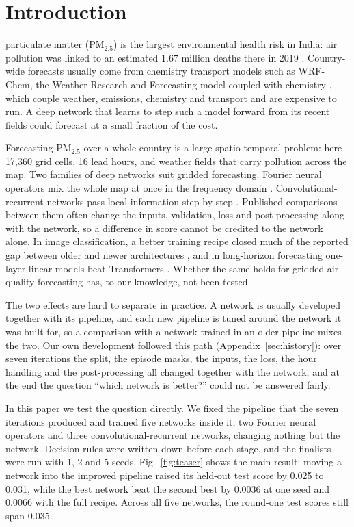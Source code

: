 \documentclass[journal]{IEEEtran}
\newcommand{\PM}{PM$_{2.5}$}
\begin{document}
\section{Introduction}
\label{sec:intro}
 particulate matter (\PM) is the largest environmental health risk in India: air pollution was linked to an estimated 1.67 million deaths there in 2019 \cite{pandey2021}. Country-wide forecasts usually come from chemistry transport models such as WRF-Chem, the Weather Research and Forecasting model coupled with chemistry \cite{grell2005}, which couple weather, emissions, chemistry and transport and are expensive to run. A deep network that learns to step such a model forward from its recent fields could forecast at a small fraction of the cost.

Forecasting \PM{} over a whole country is a large spatio-temporal problem: here 17{,}360 grid cells, 16 lead hours, and weather fields that carry pollution across the map. Two families of deep networks suit gridded forecasting. Fourier neural operators mix the whole map at once in the frequency domain \cite{li2021fno,guibas2022afno}. Convolutional-recurrent networks pass local information step by step \cite{shi2015convlstm,ballas2016convgru}. Published comparisons between them often change the inputs, validation, loss and post-processing along with the network, so a difference in score cannot be credited to the network alone. In image classification, a better training recipe closed much of the reported gap between older and newer architectures \cite{wightman2021,bello2021,liu2022convnext}, and in long-horizon forecasting one-layer linear models beat Transformers \cite{zeng2023}. Whether the same holds for gridded air quality forecasting has, to our knowledge, not been tested.

The two effects are hard to separate in practice. A network is usually developed together with its pipeline, and each new pipeline is tuned around the network it was built for, so a comparison with a network trained in an older pipeline mixes the two. Our own development followed this path (Appendix~\ref{sec:history}): over seven iterations the split, the episode masks, the inputs, the loss, the hour handling and the post-processing all changed together with the network, and at the end the question ``which network is better?'' could not be answered fairly.

In this paper we test the question directly. We fixed the pipeline that the seven iterations produced and trained five networks inside it, two Fourier neural operators and three convolutional-recurrent networks, changing nothing but the network. Decision rules were written down before each stage, and the finalists were run with 1, 2 and 5 seeds. Fig.~\ref{fig:teaser} shows the main result: moving a network into the improved pipeline raised its held-out test score by 0.025 to 0.031, while the best network beat the second best by 0.0036 at one seed and 0.0066 with the full recipe. Across all five networks, the round-one test scores still span 0.035.
\end{document}
